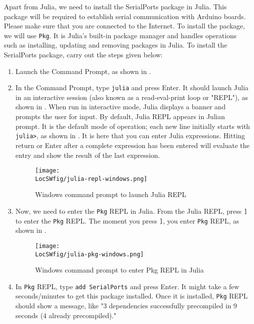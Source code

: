 Apart from Julia, we need to install the SerialPorts \cite{julia-serial-ports} package in Julia. This package will be
required to establish serial communication with Arduino boards. Please make sure that 
you are connected to the Internet. To install the package, we will use {\tt Pkg}. 
It is Julia's built-in package manager and handles operations such as installing, 
updating and removing packages in Julia. To install the SerialPorts package, carry out the steps given below:
\begin{enumerate}
      \item Launch the Command Prompt, as shown in .
      \item In the Command Prompt, type {\tt julia} and press Enter. It should launch Julia in an interactive session (also known as a read-eval-print loop or "REPL"), as shown 
      in . When run in interactive mode, Julia displays a banner and 
      prompts the user for input. By default, Julia REPL appears in Julian prompt. It is the default mode of 
      operation; each new line initially starts with {\tt julia>}, as 
      shown in . It is here that you can enter Julia expressions. 
      Hitting return or Enter after a complete expression has been entered will evaluate 
      the entry and show the result of the last expression. 
      \begin{figure}
            \centering
            \texttt{[image: \\LocSWfig/julia-repl-windows.png]}
            \caption{Windows command prompt to launch Julia REPL}
            \label{julia-repl-windows}
      \end{figure}
      \item Now, we need to enter the {\tt Pkg} REPL in Julia. From the Julia REPL, 
      press {\tt ]} to enter the {\tt Pkg} REPL. The moment you press 
      {\tt ]}, you enter {\tt Pkg} REPL, as shown in .
      \begin{figure}
            \centering
            \texttt{[image: \\LocSWfig/julia-pkg-windows.png]}
            \caption{Windows command prompt to enter Pkg REPL in Julia}
            \label{julia-pkg-windows}
      \end{figure}
      \item In {\tt Pkg} REPL, type {\tt add SerialPorts} and press Enter. It might take a few seconds/minutes  
      to get this package installed. Once it is installed, {\tt Pkg} REPL should show a message,
      like "3 dependencies successfully precompiled in 9 seconds (4 already precompiled)."
\end{enumerate}

